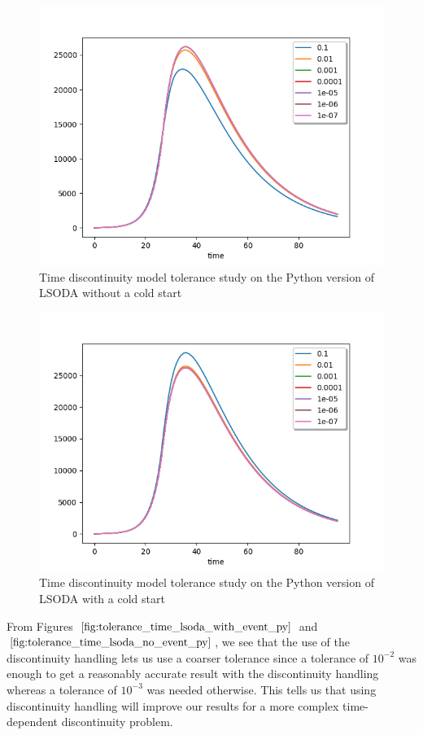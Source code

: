 \begin{figure}[H]
\centering
\includegraphics[width=0.7\linewidth]{./figures/tolerance_time_lsoda_no_event_py}
\caption{Time discontinuity model tolerance study on the Python version of LSODA without a cold start}
\label{fig:tolerance_time_lsoda_no_event_py}
\end{figure}

\begin{figure}[H]
\centering
\includegraphics[width=0.7\linewidth]{./figures/tolerance_time_lsoda_with_event_py}
\caption{Time discontinuity model tolerance study on the Python version of LSODA with a cold start}
\label{fig:tolerance_time_lsoda_with_event_py}
\end{figure}

From Figures $\ref{fig:tolerance_time_lsoda_with_event_py}$ and $\ref{fig:tolerance_time_lsoda_no_event_py}$, we see that the use of the discontinuity handling lets us use a coarser tolerance since a tolerance of $10^{-2}$ was enough to get a reasonably accurate result with the discontinuity handling whereas a tolerance of $10^{-3}$ was needed otherwise. This tells us that using discontinuity handling will improve our results for a more complex time-dependent discontinuity problem.

